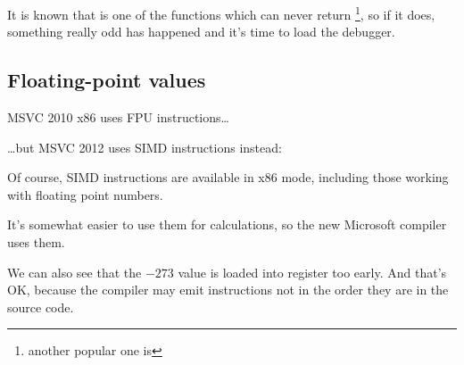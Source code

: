 It is known that  is one of the functions which can never return
\footnote{another popular one is },
so if it does, something really odd has happened and it's time to load the debugger.

\subsection{Floating-point values}



MSVC 2010 x86 uses \ac{FPU} instructions\dots



\dots but MSVC  2012 uses \ac{SIMD} instructions instead:



Of course, \ac{SIMD} instructions are available in x86 mode, 
including those working with floating point numbers.

It's somewhat easier to use them for calculations, so the new Microsoft compiler uses them.

We can also see that the $-273$ value 
is loaded into  register too early.
And that's OK, because the compiler may emit instructions not in 
the order they are in the source code.
